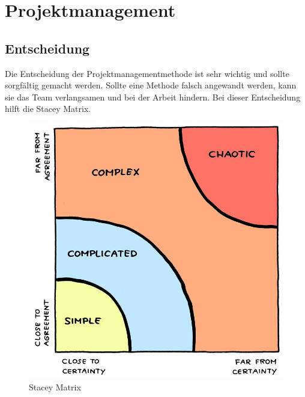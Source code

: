\chapter{Projektmanagement}
\section{Entscheidung}
Die Entscheidung der Projektmanagementmethode ist sehr wichtig und sollte sorgfältig gemacht werden. Sollte eine Methode falsch angewandt werden, kann sie das Team verlangsamen und bei der Arbeit hindern. Bei dieser Entscheidung hilft die Stacey Matrix.

\begin{figure}
  \includegraphics[width=0.9\linewidth]{./images/stacey_matrix}
  \caption[\href{https://blog.ordix.de/welches-vorgehen-eignet-sich-fuer-mein-projekt}{Stacey Matrix Grafik von Jurgen Appello.}]{Stacey Matrix}
  \label{fig:stacey}
\end{figure}\leavevmode

